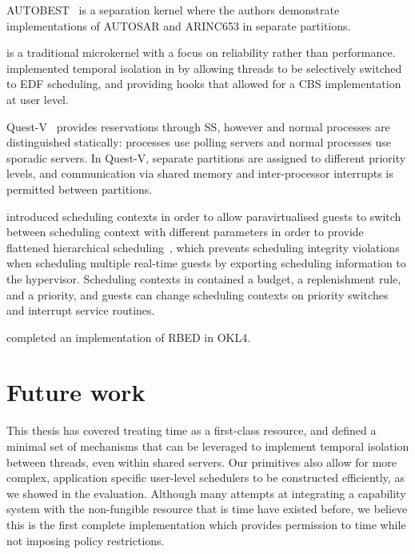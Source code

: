 AUTOBEST~\citep{Zuepke_BL_15} is a separation kernel where the authors demonstrate implementations
of AUTOSAR and ARINC653 in separate partitions.

\minix is a traditional microkernel with a focus on reliability rather than performance.
\citet{Herder_BGHT_06} implemented temporal isolation in \minix by allowing threads to be
selectively switched to \gls{EDF} scheduling, and providing hooks that allowed for a \gls{CBS}
implementation at user level. %

Quest-V~\citep{Danish_LW_11} provides reservations through \gls{SS}, however \IO and normal
processes are distinguished statically: \IO processes use polling servers and normal processes
use sporadic servers. In Quest-V, separate partitions are assigned to different priority levels,
and communication via shared memory and inter-processor interrupts is permitted between
partitions.

\fiascooc introduced scheduling contexts in order to allow paravirtualised guests to switch between
scheduling context with different parameters in order to provide flattened hierarchical
scheduling~\citep{Lackorzynski_WVH_12}, which prevents scheduling integrity violations when
scheduling multiple real-time guests by exporting scheduling information to the hypervisor.
Scheduling contexts in \fiascooc contained a budget, a replenishment rule, and a priority, and
guests can change scheduling contexts on priority switches and interrupt service routines.

\citet{Petters_LHE_09} completed an implementation of RBED in OKL4.

\section{Future work}

This thesis has covered treating time as a first-class resource, and defined a minimal set of
mechanisms that can be leveraged to implement temporal isolation between threads, even within shared
servers. Our primitives also allow for more complex, application specific user-level schedulers to
be constructed efficiently, as we showed in the evaluation. Although many attempts at integrating a
capability system with the non-fungible resource that is time have existed before, we believe this is
the first complete implementation which provides permission to time while not imposing policy
restrictions. 

